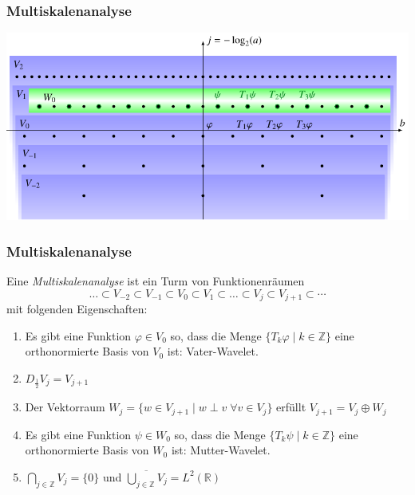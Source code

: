 %
%
%
\begin{frame}
\frametitle{Multiskalenanalyse}
\begin{center}
\includegraphics[width=\hsize]{../../buch/chapters/6-msa/images/msa.pdf}
\end{center}
\end{frame}



\begin{frame}
\frametitle{Multiskalenanalyse}
\begin{definition}
Eine {\em Multiskalenanalyse} ist ein Turm von Funktionenräumen
\[
\dots \subset
V_{-2} \subset V_{-1} \subset V_0 \subset V_1 \subset \dots \subset V_j \subset V_{j+1} \subset \cdots 
\]
mit folgenden Eigenschaften:
\begin{enumerate}
\item<2->
Es gibt eine Funktion $\varphi\in V_0$ so, dass die Menge
$\{T_k\varphi\;|\; k\in\mathbb Z\}$ eine orthonormierte Basis von $V_0$ ist:
Vater-Wavelet.
\item<3->
$D_{\frac12}V_j = V_{j+1}$
\item<4->
Der Vektorraum $W_j = \{w\in V_{j+1}\;|\; w\perp v\;\forall v\in V_j\}$
erfüllt $V_{j+1} = V_j \oplus W_j$
\item<5->
Es gibt eine Funktion $\psi\in W_0$ so, dass die Menge
$\{T_k\psi\;|\; k\in\mathbb Z\}$ eine orthonormierte Basis von $W_0$ ist:
Mutter-Wavelet.
\item<6->
$\bigcap_{j\in\mathbb Z} V_j = \{0\}$ und
$\overline{\bigcup_{j\in\mathbb Z}V_j}= L^2(\mathbb R)$
\end{enumerate}
\end{definition}

\end{frame}

